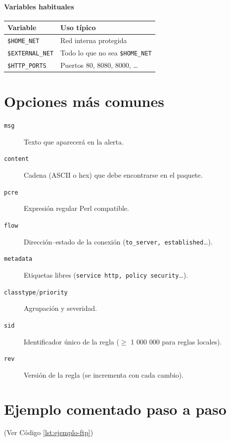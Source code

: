 \documentclass[11pt,a4paper,twoside]{report}
\begin{document}
\paragraph{Variables habituales}

\begin{center}
	\begin{tabular}{ll}
		\toprule
		Variable & Uso típico \\
		\midrule
		\verb|$HOME_NET| & Red interna protegida \\
		\verb|$EXTERNAL_NET| & Todo lo que no sea \verb|$HOME_NET| \\
		\verb|$HTTP_PORTS| & Puertos 80, 8080, 8000, … \\
		\bottomrule
	\end{tabular}
\end{center}

\section{Opciones más comunes}

\begin{description}
	\item[\textnormal{\texttt{msg}}]       Texto que aparecerá en la alerta.
	\item[\textnormal{\texttt{content}}]   Cadena (ASCII o hex) que debe encontrarse en el paquete.
	\item[\textnormal{\texttt{pcre}}]      Expresión regular Perl compatible.
	\item[\textnormal{\texttt{flow}}]      Dirección–estado de la conexión (\texttt{to\_server, established}\dots).
	\item[\textnormal{\texttt{metadata}}]  Etiquetas libres (\texttt{service http, policy security}\dots).
	\item[\textnormal{\texttt{classtype}}/\textnormal{\texttt{priority}}]
	Agrupación y severidad.
	\item[\textnormal{\texttt{sid}}] Identificador único de la regla ($\geq$ 1 000 000 para reglas locales).
	\item[\textnormal{\texttt{rev}}]       Versión de la regla (se incrementa con cada cambio).
\end{description}

\section{Ejemplo comentado paso a paso}

(Ver Código \ref{lst:ejemplo-ftp})
\end{document}

